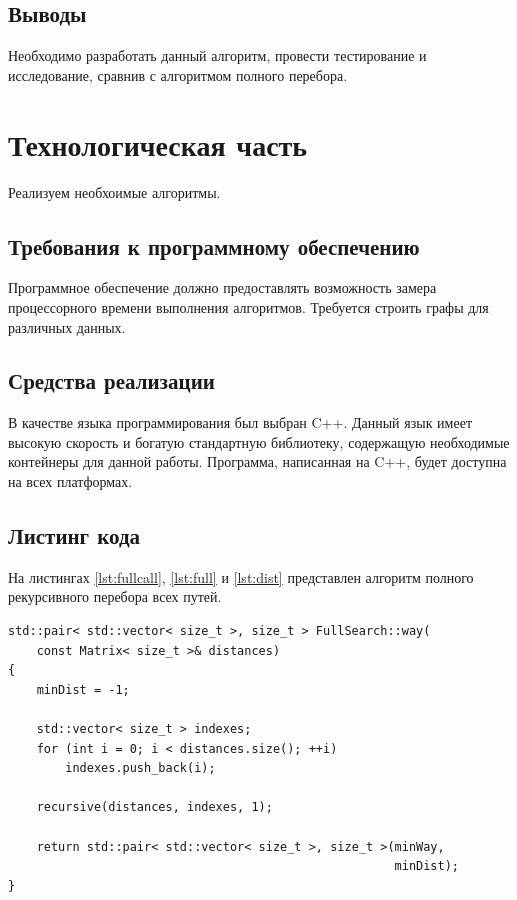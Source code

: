\documentclass[a4paper,12pt]{article}
\begin{document}
\subsection{Выводы}

Необходимо разработать данный алгоритм, провести тестирование и исследование, сравнив с
алгоритмом полного перебора.

\newpage
\section{Технологическая часть}

Реализуем необхоимые алгоритмы.

\subsection{Требования к программному обеспечению}

Программное обеспечение должно предоставлять возможность замера процессорного времени выполнения алгоритмов.
Требуется строить графы для различных данных.

\subsection{Средства реализации}

В качестве языка программирования был выбран {\ttfamily C++}.
Данный язык имеет высокую скорость и богатую стандартную библиотеку,
содержащую необходимые контейнеры для данной работы. Программа, написанная на
{\ttfamily C++}, будет доступна на всех платформах.

\subsection{Листинг кода}

На листингах \ref{lst:fullcall}, \ref{lst:full} и \ref{lst:dist} представлен алгоритм полного рекурсивного
перебора всех путей.

\begin{lstlisting}[caption=Вызов алгоритма рекурсивного перебора,label=lst:fullcall]
std::pair< std::vector< size_t >, size_t > FullSearch::way(
    const Matrix< size_t >& distances)
{
    minDist = -1;

    std::vector< size_t > indexes;
    for (int i = 0; i < distances.size(); ++i)
        indexes.push_back(i);

    recursive(distances, indexes, 1);

    return std::pair< std::vector< size_t >, size_t >(minWay,
                                                      minDist);
}
\end{lstlisting}
\end{document}
